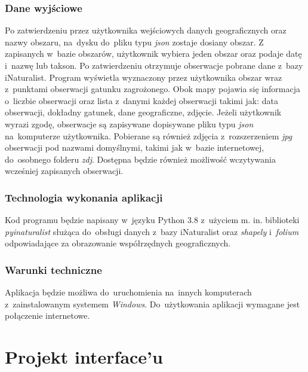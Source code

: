 \documentclass{article}
\begin{document}
 \subsubsection{Dane wyjściowe}
 Po zatwierdzeniu przez użytkownika wejściowych danych geograficznych oraz nazwy obszaru, na~dysku do~pliku typu \textit{json} zostaje dosiany obszar. Z zapisanych w~bazie obszarów, użytkownik wybiera jeden obszar oraz podaje datę i~nazwę lub takson. Po zatwierdzeniu otrzymuje obserwacje pobrane dane z~bazy iNaturalist. Program wyświetla wyznaczony przez użytkownika obszar wraz z~punktami obserwacji gatunku zagrożonego. Obok mapy pojawia się informacja o~liczbie obserwacji oraz lista z~danymi każdej obserwacji takimi jak: data obserwacji, dokładny gatunek, dane geograficzne, zdjęcie. Jeżeli użytkownik wyrazi zgodę, obserwacje są zapisywane dopisywane pliku typu \textit{json} na~komputerze użytkownika. Pobierane są również zdjęcia z~rozszerzeniem \textit{jpg} obserwacji pod nazwami domyślnymi, takimi jak w~bazie internetowej, do~osobnego folderu \textit{zdj}. Dostępna będzie również możliwość wczytywania wcześniej zapisanych obserwacji.
 

 \subsubsection{Technologia wykonania aplikacji}
 Kod programu będzie napisany w~języku Python 3.8 z~użyciem m. in. biblioteki \textit{pyinaturalist} służąca do~obsługi danych z~bazy iNaturalist oraz \textit{shapely} i~\textit{folium} odpowiadające za obrazowanie współrzędnych geograficznych.
 \subsubsection{Warunki techniczne}
 Aplikacja będzie możliwa do~uruchomienia na~innych komputerach z~zainstalowanym systemem \textit{Windows}. Do~użytkowania aplikacji wymagane jest połączenie internetowe.

 \newpage
 \section{Projekt interface'u}
\end{document}
